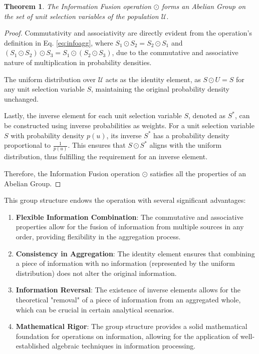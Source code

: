 \documentclass[letterpaper]{article} %
\newtheorem{theorem}{Theorem}
\theoremstyle{definition}
\theoremstyle{remark}
\begin{document}
\begin{theorem}
The Information Fusion operation $\odot$ forms an Abelian Group on the set of unit selection variables of the population $\mathcal{U}$.
\end{theorem}

\begin{proof}
Commutativity and associativity are directly evident from the operation's definition in Eq. \eqref{eq:infoagg}, where $S_1 \odot S_2 = S_2 \odot S_1$ and $(S_1 \odot S_2) \odot S_3 = S_1 \odot (S_2 \odot S_3)$, due to the commutative and associative nature of multiplication in probability densities.

The uniform distribution over $\mathcal{U}$ acts as the identity element, as $S \odot U = S$ for any unit selection variable $S$, maintaining the original probability density unchanged.

Lastly, the inverse element for each unit selection variable $S$, denoted as $S^*$, can be constructed using inverse probabilities as weights. For a unit selection variable $S$ with probability density $p(u)$, its inverse $S^*$ has a probability density proportional to $\frac{1}{p(u)}$. This ensures that $S \odot S^*$ aligns with the uniform distribution, thus fulfilling the requirement for an inverse element.

Therefore, the Information Fusion operation $\odot$ satisfies all the properties of an Abelian Group.
\end{proof}

This group structure endows the operation with several significant advantages:

\begin{enumerate}
    \item \textbf{Flexible Information Combination}: The commutative and associative properties allow for the fusion of information from multiple sources in any order, providing flexibility in the aggregation process.
    
    \item \textbf{Consistency in Aggregation}: The identity element ensures that combining a piece of information with no information (represented by the uniform distribution) does not alter the original information.
    
    \item \textbf{Information Reversal}: The existence of inverse elements allows for the theoretical "removal" of a piece of information from an aggregated whole, which can be crucial in certain analytical scenarios.
    
    \item \textbf{Mathematical Rigor}: The group structure provides a solid mathematical foundation for operations on information, allowing for the application of well-established algebraic techniques in information processing.
\end{enumerate}
\end{document}
